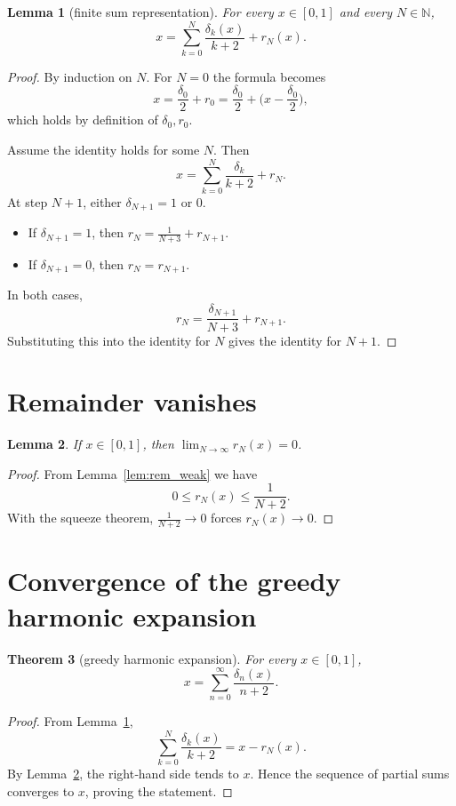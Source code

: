 \documentclass[11pt,a4paper]{article}
\newtheorem{theorem}{Theorem}[section]
\newtheorem{lemma}[theorem]{Lemma}
\theoremstyle{definition}
\theoremstyle{remark}
\newcommand{\N}{\mathbb{N}}
\begin{document}
\begin{lemma}[finite sum representation]\label{lem:finite_sum}
For every \(x\in[0,1]\) and every \(N\in\N\),
\[
x = \sum_{k=0}^{N} \frac{\delta_k(x)}{k+2} + r_N(x).
\]
\end{lemma}
\begin{proof}
By induction on \(N\). For \(N=0\) the formula becomes
\[
x = \frac{\delta_0}{2} + r_0 = \frac{\delta_0}{2} + \bigl(x-\frac{\delta_0}{2}\bigr),
\]
which holds by definition of \(\delta_0,r_0\).

Assume the identity holds for some \(N\). Then
\[
x = \sum_{k=0}^{N} \frac{\delta_k}{k+2} + r_N.
\]
At step \(N+1\), either \(\delta_{N+1}=1\) or \(0\).
\begin{itemize}
\item If \(\delta_{N+1}=1\), then \(r_N = \frac1{N+3} + r_{N+1}\).
\item If \(\delta_{N+1}=0\), then \(r_N = r_{N+1}\).
\end{itemize}
In both cases,
\[
r_N = \frac{\delta_{N+1}}{N+3} + r_{N+1}.
\]
Substituting this into the identity for \(N\) gives the identity for \(N+1\).
\end{proof}

\section{Remainder vanishes}

\begin{lemma}\label{lem:rem_zero}
If \(x\in[0,1]\), then \(\displaystyle\lim_{N\to\infty} r_N(x) = 0\).
\end{lemma}
\begin{proof}
From Lemma~\ref{lem:rem_weak} we have
\[
0 \le r_N(x) \le \frac1{N+2}.
\]
With the squeeze theorem, \(\frac1{N+2}\to0\) forces \(r_N(x)\to0\).
\end{proof}

\section{Convergence of the greedy harmonic expansion}

\begin{theorem}[greedy harmonic expansion]\label{thm:expansion}
For every \(x\in[0,1]\),
\[
x = \sum_{n=0}^{\infty} \frac{\delta_n(x)}{n+2}.
\]
\end{theorem}
\begin{proof}
From Lemma~\ref{lem:finite_sum},
\[
\sum_{k=0}^{N} \frac{\delta_k(x)}{k+2} = x - r_N(x).
\]
By Lemma~\ref{lem:rem_zero}, the right‑hand side tends to \(x\). Hence the sequence of partial sums converges to \(x\), proving the statement.
\end{proof}
\end{document}
